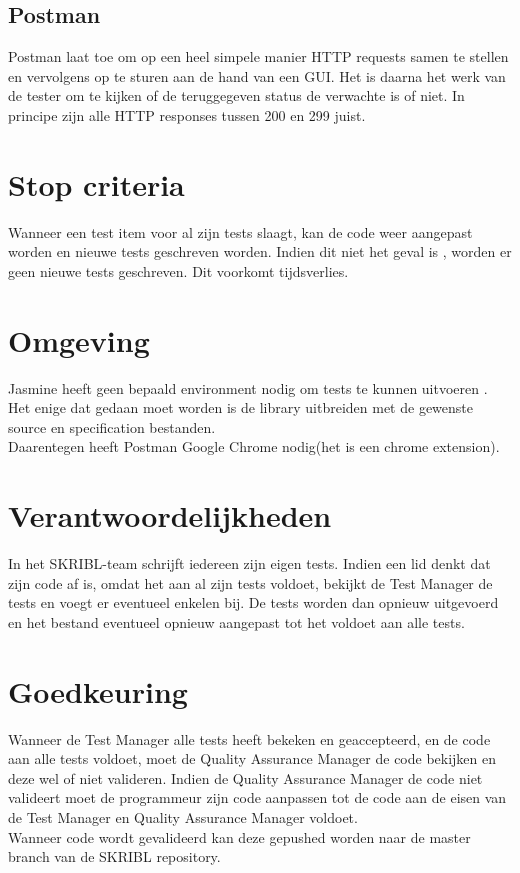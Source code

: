\documentclass{article}
\begin{document}
\subsection{Postman}
Postman laat toe om op een heel simpele manier HTTP requests samen te stellen en vervolgens op te sturen aan de hand van een GUI. Het is daarna het werk van de tester om te kijken of de teruggegeven status de verwachte is of niet. In principe zijn alle HTTP responses tussen 200 en 299 juist.


\section{Stop criteria}
Wanneer een test item voor al zijn tests slaagt, kan de code weer aangepast worden en nieuwe tests geschreven worden. Indien dit niet het geval is , worden er geen nieuwe tests geschreven. Dit voorkomt tijdsverlies.

\section{Omgeving}
Jasmine heeft geen bepaald environment nodig om tests te kunnen uitvoeren . Het enige dat gedaan moet worden is de library uitbreiden met de gewenste source en specification bestanden.
\\
Daarentegen heeft Postman Google Chrome nodig(het is een chrome extension). 

\section{Verantwoordelijkheden}
In het SKRIBL-team schrijft iedereen zijn eigen tests. Indien een lid denkt dat zijn code af is, omdat het aan al zijn tests voldoet, bekijkt de Test Manager de tests en voegt er eventueel enkelen bij. De tests worden dan opnieuw uitgevoerd en het bestand eventueel opnieuw aangepast tot het voldoet aan alle tests. 

\section{Goedkeuring}
Wanneer de Test Manager alle tests heeft bekeken en geaccepteerd, en de code aan alle tests voldoet, moet de Quality Assurance Manager de code bekijken en deze wel of niet valideren.  Indien de Quality Assurance Manager de code niet valideert moet de programmeur zijn code aanpassen tot de code aan de eisen van de Test Manager en Quality Assurance Manager voldoet.
\\
Wanneer code wordt gevalideerd kan deze gepushed worden naar de master branch van de SKRIBL repository.


\clearpage
\end{document}
